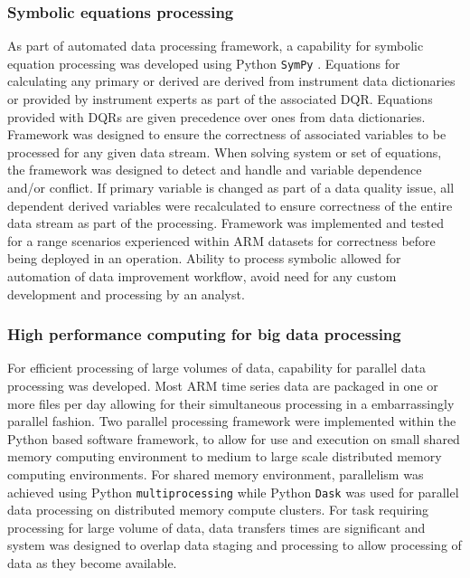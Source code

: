 \subsubsection{Symbolic equations processing}
As part of automated data processing framework, a capability for
symbolic equation processing was developed using Python \texttt{SymPy}
\cite{sympy}. Equations for calculating any primary or derived are
derived from instrument data dictionaries or provided by instrument
experts as part of the associated DQR. Equations provided with DQRs are
given precedence over ones from data dictionaries. Framework was
designed to ensure the correctness of associated variables to be
processed for any given data stream. When solving system or set of
equations, the framework was designed to detect and handle and variable
dependence and/or conflict. If primary variable is changed as part of
a data quality issue, all dependent derived variables were recalculated
to ensure correctness of the entire data stream as part of the processing.
Framework was implemented and tested for a range scenarios experienced
within ARM datasets for correctness before being deployed in an
operation. Ability to process symbolic allowed for automation of data
improvement workflow, avoid need for any custom development and
processing by an analyst.

\subsubsection{High performance computing for big data processing}
For efficient processing of large volumes of data, capability for
parallel data processing was developed. Most ARM time series data are
packaged in one or more files per day allowing for their simultaneous
processing in a embarrassingly parallel fashion. Two parallel processing
framework were implemented within the Python based software framework,
to allow for use and execution on small shared memory computing
environment to medium to large scale distributed memory computing
environments. For shared memory environment, parallelism was achieved
using Python \texttt{multiprocessing} while Python \texttt{Dask}
\cite{dask} was used for parallel data processing on distributed memory
compute clusters. For task requiring processing for large volume of
data, data transfers times are significant and system was designed to
overlap data staging and processing to allow processing of data as they
become available.

